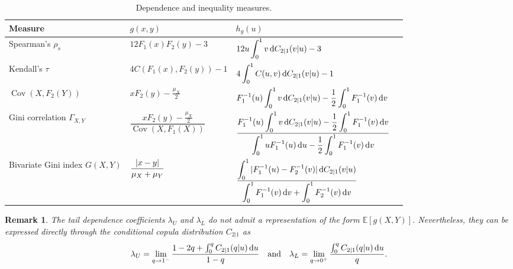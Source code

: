 \documentclass[12pt]{article}
\newtheorem{remark}[theo]{Remark}%
\begin{document}
\begin{table}[H]
\centering
\caption{Dependence and inequality measures.}
\renewcommand{\arraystretch}{1.2}
\begin{tabular}{llll}
\hline
Measure & $g(x,y)$ & $h_g(u)$\\
\hline

Spearman's $\rho_s$
&
$12F_1(x)F_2(y)-3$
&
$\displaystyle
12u
\int_0^1
v\,{\rm d}C_{2|1}(v|u)
-3
$
\\[2mm]

Kendall's $\tau$
&
$4C(F_1(x),F_2(y))-1$
&
$\displaystyle
4
\int_0^1
C(u,v)\,
{\rm d}C_{2|1}(v|u)
-1
$
\\[2mm]

$\operatorname{Cov}(X,F_2(Y))$
&
$\displaystyle xF_2(y)-\frac{\mu_X}{2}$
&
$\displaystyle
F_1^{-1}(u)
\int_0^1
v\,{\rm d}C_{2|1}(v|u)
-
{1\over 2} \int_0^1F_1^{-1}(v)\,{\rm d}v
$
\\[4mm]

Gini correlation 
$\Gamma_{X,Y}$
&
$\dfrac{\displaystyle xF_2(y)-\frac{\mu_X}{2}}{\operatorname{Cov}(X,F_1(X))}$
&
$
\dfrac{\displaystyle  
F_1^{-1}(u)
\int_0^1
v\,{\rm d}C_{2|1}(v|u) -{1\over 2}\int_0^1F_1^{-1}(v)\,{\rm d}v }{\displaystyle
\int_0^1
uF_1^{-1}(u)\,{\rm d}u
-{1\over 2}\int_0^1F_1^{-1}(v)\,{\rm d}v}$
\\[9mm]

Bivariate Gini index 
$G(X,Y)$
&
$\displaystyle {|x-y|\over \mu_X+\mu_Y}$
&
$\displaystyle
\dfrac{\displaystyle
\int_0^1
|F_1^{-1}(u)-F_2^{-1}(v)|
\,{\rm d}C_{2|1}(v|u)
}{\displaystyle
\int_0^1F_1^{-1}(v)\,{\rm d}v
+
\int_0^1F_2^{-1}(v)\,{\rm d}v
}
$
\\[8mm]

\hline
\end{tabular}
\label{Table-3}
\end{table}

\begin{remark}
The tail dependence coefficients $\lambda_U$ and $\lambda_L$ do not admit a representation of the form
$\mathbb E[g(X,Y)]$.
Nevertheless, they can be expressed directly through the conditional copula
distribution $C_{2|1}$ as
\[
\lambda_U
=
\lim_{q\to1^-}
\frac{
1-2q+\int_0^q C_{2|1}(q|u)\,{\rm d}u
}{1-q}
\quad 
\text{and}
\quad 
\lambda_L
=
\lim_{q\to0^+}
\frac{
\int_0^q C_{2|1}(q|u)\,{\rm d}u
}{q}.
\]
\end{remark}
\end{document}
